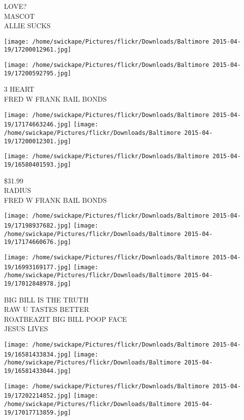 \documentclass[10pt,letterpaper]{article}
\begin{document}
LOVE?\\
MASCOT\\
ALLIE SUCKS\\
\pagebreak

\texttt{[image: /home/swickape/Pictures/flickr/Downloads/Baltimore 2015-04-19/17200012961.jpg]}

\vspace{0.25in}
\texttt{[image: /home/swickape/Pictures/flickr/Downloads/Baltimore 2015-04-19/17200592795.jpg]}

3 HEART\\
FRED W FRANK BAIL BONDS\\
\pagebreak

\texttt{[image: /home/swickape/Pictures/flickr/Downloads/Baltimore 2015-04-19/17174663246.jpg]}
\texttt{[image: /home/swickape/Pictures/flickr/Downloads/Baltimore 2015-04-19/17200012301.jpg]}

\vspace{0.25in}
\texttt{[image: /home/swickape/Pictures/flickr/Downloads/Baltimore 2015-04-19/16580401593.jpg]}

\$31.99\\
RADIUS\\
FRED W FRANK BAIL BONDS\\
\pagebreak

\texttt{[image: /home/swickape/Pictures/flickr/Downloads/Baltimore 2015-04-19/17198937682.jpg]}
\texttt{[image: /home/swickape/Pictures/flickr/Downloads/Baltimore 2015-04-19/17174660676.jpg]}

\texttt{[image: /home/swickape/Pictures/flickr/Downloads/Baltimore 2015-04-19/16993169177.jpg]}
\texttt{[image: /home/swickape/Pictures/flickr/Downloads/Baltimore 2015-04-19/17012848978.jpg]}

BIG BILL IS THE TRUTH\\
RAW U TASTES BETTER\\
ROATBEAZIT BIG BILL POOP FACE\\
JESUS LIVES\\
\pagebreak

\texttt{[image: /home/swickape/Pictures/flickr/Downloads/Baltimore 2015-04-19/16581433834.jpg]}
\texttt{[image: /home/swickape/Pictures/flickr/Downloads/Baltimore 2015-04-19/16581433044.jpg]}

\texttt{[image: /home/swickape/Pictures/flickr/Downloads/Baltimore 2015-04-19/17202214852.jpg]}
\texttt{[image: /home/swickape/Pictures/flickr/Downloads/Baltimore 2015-04-19/17017713859.jpg]}
\end{document}
